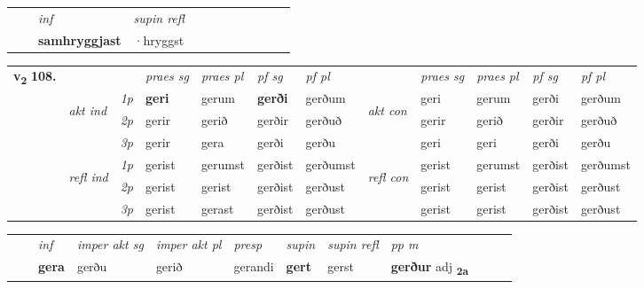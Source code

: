 \begin{tabular}{llllllllllll}
 & & \textit{inf}       & \textit{supin refl}      \\*
  & & \textbf{samhryggjast}        & ·hryggst  \\*
\cmidrule{1-12}
\end{tabular}



\begin{tabular}{llllllllllll} \toprule
\multirow{4}{*}{{{\textbf{v{\textsubscript{2}}} \Large{\textbf{108.}}}}}  & &   &  \textit{praes sg}  & \textit{praes pl}  &\textit{ pf sg} & \textit{pf pl} &  &  \textit{praes sg}  & \textit{praes pl}  & \textit{pf sg} & \textit{pf pl } \\*
	\cmidrule{4-7} \cmidrule{9-12}
 & \multirow{3}{*}{\begin{turn}{90}\textit{akt ind}\end{turn}} & {\textit{1p}} & \textbf{geri} & gerum    & \textbf{gerði} & gerðum & \multirow{3}{*}{\begin{turn}{90}\textit{akt con}\end{turn}} &geri & gerum & gerði & gerðum\\*
& &  {\textit{2p}} &  gerir  & gerið   & gerðir & gerðuð & & gerir & gerið & gerðir & gerðuð \\*
& &  {\textit{3p}} & gerir & gera   & gerði & gerðu & & geri & geri& gerði & gerðu  \\*
\cmidrule{4-7} \cmidrule{9-12}
 &\multirow{3}{*}{\begin{turn}{90}\textit{refl ind}\end{turn}} & {\textit{1p}} & gerist & gerumst    & gerðist & gerðumst & \multirow{3}{*}{\begin{turn}{90}\textit{refl con}\end{turn}}  &gerist & gerumst & gerðist & gerðumst\\*
 &&  {\textit{2p}} &  gerist  & gerist   & gerðist & gerðust & &gerist & gerist & gerðist & gerðust \\*
& &  {\textit{3p}} & gerist & gerast   & gerðist & gerðust & & gerist & gerist& gerðist & gerðust  \\*
\cmidrule{4-7} \cmidrule{9-12}
\end{tabular}


\begin{tabular}{llllllllllll}
 & & \textit{inf} & \textit{imper akt sg} & \textit{imper akt pl}   & \textit{presp} & \textit{supin} & \textit{supin refl} & \textit{pp m}     \\*
  & & \textbf{gera} & gerðu  & gerið   & gerandi &  \textbf{gert} & gerst & \textbf{gerður} adj \textbf{\textsubscript{2a}} \\*
\cmidrule{1-12}
\end{tabular}



